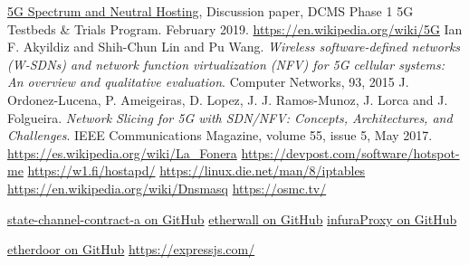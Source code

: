 \documentclass[12pt]{amsart}
\begin{document}
\begin{multicols}{2}
\begin{thebibliography}{9}

  \href{https://uk5g.org/media/uploads/resource_files/Spectrum\_NH\_discussion\_paper\_20Feb19.pdf}{5G Spectrum and Neutral Hosting}, Discussion paper,
  DCMS Phase 1 5G Testbeds \& Trials Program. February 2019.
 \href{https://en.wikipedia.org/wiki/5G}{https://en.wikipedia.org/wiki/5G}
 Ian F. Akyildiz and Shih-Chun Lin and Pu Wang.
  \textit{Wireless software-defined networks (W-SDNs) and network function virtualization (NFV) for 5G cellular systems:
    An overview and qualitative evaluation}. Computer Networks, 93, 2015
 J. Ordonez-Lucena, P. Ameigeiras, D. Lopez, J. J. Ramos-Munoz, J. Lorca and J. Folgueira.
  \textit{Network Slicing for 5G with SDN/NFV: Concepts, Architectures, and Challenges}.
   IEEE Communications Magazine, volume 55, issue 5, May 2017.
 \href{https://es.wikipedia.org/wiki/La_Fonera}{https://es.wikipedia.org/wiki/La\_Fonera}
 \href{https://devpost.com/software/hotspot-me}{https://devpost.com/software/hotspot-me}
 \href{https://w1.fi/hostapd/}{https://w1.fi/hostapd/}
 \href{https://linux.die.net/man/8/iptables}{https://linux.die.net/man/8/iptables}
 \href{https://en.wikipedia.org/wiki/Dnsmasq}{https://en.wikipedia.org/wiki/Dnsmasq}
 \href{https://osmc.tv/}{https://osmc.tv/}

  \href{https://github.com/ethereum-internet-access/state-channel-contract-a}{state-channel-contract-a on GitHub}
  \href{https://github.com/ethereum-internet-access/etherwall}{etherwall on GitHub}
  \href{https://github.com/ethereum-internet-access/etherwall/blob/master/infuraProxy.js}{infuraProxy on GitHub}

  \href{https://github.com/ethereum-internet-access/etherdoor}{etherdoor on GitHub}
  \href{https://expressjs.com/}{https://expressjs.com/}


\end{thebibliography}
\end{multicols}
\end{document}
